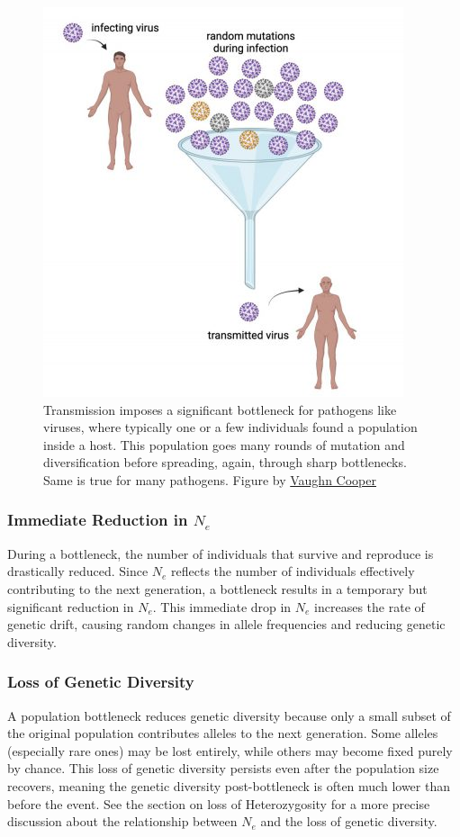 \documentclass[10pt,a4paper]{scrbook}
\begin{document}
\begin{figure}
    \centering
    \includegraphics[width=0.5\linewidth]{VirusBottleneck.png}
    \caption{Transmission imposes a significant bottleneck for pathogens like viruses, where typically one or a few individuals found a population inside a host. This population goes many rounds of mutation and diversification before spreading, again, through sharp bottlenecks. Same is true for many pathogens. Figure by \href{https://inside.upmc.com/massive-numbers-of-new-covid-19-infections-not-vaccines-are-the-main-driver-of-new-coronavirus-variants/}{Vaughn Cooper}}
    \label{fig:bottleneck1}
\end{figure}

\subsubsection{Immediate Reduction in \(N_e\)}

During a bottleneck, the number of individuals that survive and reproduce is drastically reduced. Since \(N_e\) reflects the number of individuals effectively contributing to the next generation, a bottleneck results in a temporary but significant reduction in \(N_e\). This immediate drop in \(N_e\) increases the rate of genetic drift, causing random changes in allele frequencies and reducing genetic diversity.

\subsubsection{Loss of Genetic Diversity}

A population bottleneck reduces genetic diversity because only a small subset of the original population contributes alleles to the next generation. Some alleles (especially rare ones) may be lost entirely, while others may become fixed purely by chance. This loss of genetic diversity persists even after the population size recovers, meaning the genetic diversity post-bottleneck is often much lower than before the event. See the section on loss of Heterozygosity for a more precise discussion about the relationship between \(N_e\) and the loss of genetic diversity. 
\end{document}
